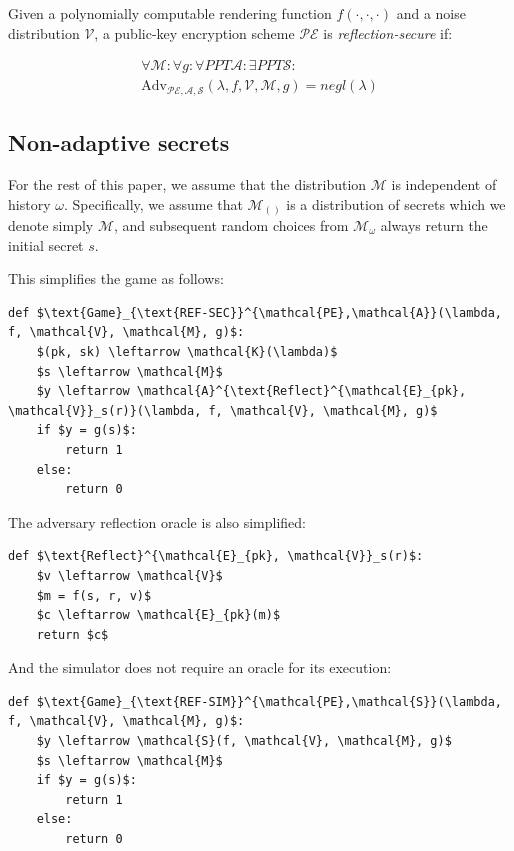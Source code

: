 \documentclass[conference, letterpaper, 10pt]{IEEEtran}
\begin{document}
Given a polynomially computable rendering function $f(\cdot, \cdot, \cdot)$ and
a  noise distribution $\mathcal{V}$, a public-key encryption scheme
$\mathcal{PE}$ is \textit{reflection-secure} if:

\begin{align*}
\forall \mathcal{M}:
\forall g:
\forall PPT \mathcal{A}:
\exists PPT \mathcal{S}:\\
\text{Adv}_{\mathcal{PE}, \mathcal{A}, \mathcal{S}}(\lambda, f, \mathcal{V}, \mathcal{M}, g) = negl(\lambda)
\end{align*}

\subsection{Non-adaptive secrets}\label{subsec:refsecnonadapt}

For the rest of this paper, we assume that the distribution $\mathcal{M}$ is
independent of history $\omega$. Specifically, we assume that $\mathcal{M}_{()}$
is a distribution of secrets which we denote simply $\mathcal{M}$, and subsequent
random choices from $\mathcal{M}_\omega$ always return the initial secret $s$.

This simplifies the game as follows:

\begin{lstlisting}[texcl,mathescape]
def $\text{Game}_{\text{REF-SEC}}^{\mathcal{PE},\mathcal{A}}(\lambda, f, \mathcal{V}, \mathcal{M}, g)$:
    $(pk, sk) \leftarrow \mathcal{K}(\lambda)$
    $s \leftarrow \mathcal{M}$
    $y \leftarrow \mathcal{A}^{\text{Reflect}^{\mathcal{E}_{pk}, \mathcal{V}}_s(r)}(\lambda, f, \mathcal{V}, \mathcal{M}, g)$
    if $y = g(s)$:
        return 1
    else:
        return 0
\end{lstlisting}

The adversary reflection oracle is also simplified:

\begin{lstlisting}[texcl,mathescape]
def $\text{Reflect}^{\mathcal{E}_{pk}, \mathcal{V}}_s(r)$:
    $v \leftarrow \mathcal{V}$
    $m = f(s, r, v)$
    $c \leftarrow \mathcal{E}_{pk}(m)$
    return $c$
\end{lstlisting}

And the simulator does not require an oracle for its execution:

\begin{lstlisting}[texcl,mathescape]
def $\text{Game}_{\text{REF-SIM}}^{\mathcal{PE},\mathcal{S}}(\lambda, f, \mathcal{V}, \mathcal{M}, g)$:
    $y \leftarrow \mathcal{S}(f, \mathcal{V}, \mathcal{M}, g)$
    $s \leftarrow \mathcal{M}$
    if $y = g(s)$:
        return 1
    else:
        return 0
\end{lstlisting}
\end{document}
